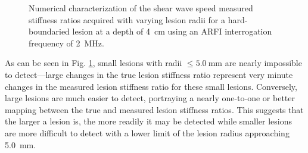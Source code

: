 			\begin{figure}[!htb]
				\centering
				\caption[Numerical characterization of shear wave speed measured stiffness ratio with changing lesion radius]{Numerical characterization of the shear wave speed measured stiffness ratios acquired with varying lesion radii for a hard-boundaried lesion at a depth of \SI{4}{\cm} using an ARFI interrogation frequency of \SI{2}{\MHz}.}
				\label{fig:erel_radius}
			\end{figure}

			As can be seen in Fig. \ref{fig:erel_radius}, small lesions with radii $\leq \SI{5.0}{\mm}$ are nearly impossible to detect---large changes in the true lesion stiffness ratio represent very minute changes in the measured lesion stiffness ratio for these small lesions. Conversely, large lesions are much easier to detect, portraying a nearly one-to-one or better mapping between the true and measured lesion stiffness ratios. This suggests that the larger a lesion is, the more readily it may be detected while smaller lesions are more difficult to detect with a lower limit of the lesion radius approaching \SI{5.0}{\mm}.

